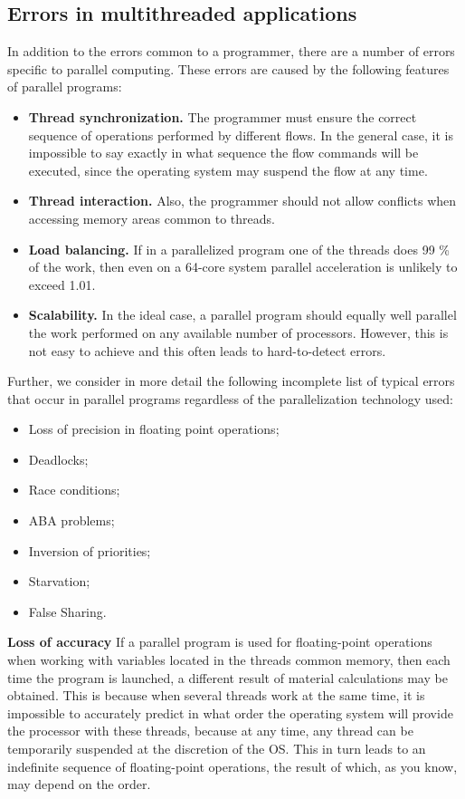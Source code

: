 { %
	\subsection{Errors in multithreaded applications}
	\par In addition to the errors common to a programmer, there are a number of errors specific to parallel computing. These errors are caused by the following features of parallel programs:
	\begin{itemize}
		\item\textbf{Thread synchronization.} The programmer must ensure the correct sequence of operations performed by different flows. In the general case, it is impossible to say exactly in what sequence the flow commands will be executed, since the operating system may suspend the flow at any time.
		\item\textbf{Thread interaction.} Also, the programmer should not allow conflicts when accessing memory areas common to threads.
		\item\textbf{Load balancing.} If in a parallelized program one of the threads does 99 \% of the work, then even on a 64-core system parallel acceleration is unlikely to exceed 1.01.
		\item\textbf{Scalability.} In the ideal case, a parallel program should equally well parallel the work performed on any available number of processors. However, this is not easy to achieve and this often leads to hard-to-detect errors.
	\end{itemize}
	\par Further, we consider in more detail the following incomplete list of typical errors that occur in parallel programs regardless of the parallelization technology used:
	\begin{itemize}
		\item Loss of precision in floating point operations;
		\item Deadlocks;
		\item Race conditions;
		\item ABA problems;
		\item Inversion of priorities;
		\item Starvation;
		\item False Sharing.
	\end{itemize}
	\par\textbf{Loss of accuracy} If a parallel program is used for floating-point operations when working with variables located in the threads common memory, then each time the program is launched, a different result of material calculations may be obtained. This is because when several threads work at the same time, it is impossible to accurately predict in what order the operating system will provide the processor with these threads, because at any time, any thread can be temporarily suspended at the discretion of the OS. This in turn leads to an indefinite sequence of floating-point operations, the result of which, as you know, may depend on the order.
}
